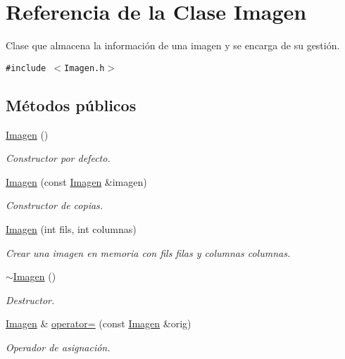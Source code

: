 \hypertarget{classImagen}{
\section{Referencia de la Clase Imagen}
\label{classImagen}
}
Clase que almacena la información de una imagen y se encarga de su gestión.  


{\tt \#include $<$Imagen.h$>$}

\subsection*{Métodos públicos}
\begin{CompactItemize}
\item 
\hyperlink{classImagen_b2e649aa7a105155c7bfdb846abf0528}{Imagen} ()
\begin{CompactList}\small\item\em Constructor por defecto. \item\end{CompactList}\item 
\hyperlink{classImagen_88a2fe0c7fa0693b40190df137a0725a}{Imagen} (const \hyperlink{classImagen}{Imagen} \&imagen)
\begin{CompactList}\small\item\em Constructor de copias. \item\end{CompactList}\item 
\hyperlink{classImagen_36b8bfdc04ed34f7e342e96eb2943181}{Imagen} (int fils, int columnas)
\begin{CompactList}\small\item\em Crear una imagen en memoria con fils filas y columnas columnas. \item\end{CompactList}\item 
\hyperlink{classImagen_03dd93c9cf920a9dc0b72f8bd34f2e8a}{$\sim$Imagen} ()
\begin{CompactList}\small\item\em Destructor. \item\end{CompactList}\item 
\hyperlink{classImagen}{Imagen} \& \hyperlink{classImagen_9cfdf5f496d78247026783b4026458e8}{operator=} (const \hyperlink{classImagen}{Imagen} \&orig)
\begin{CompactList}\small\item\em Operador de asignación. \item\end{CompactList}\item 

\end{CompactItemize}
